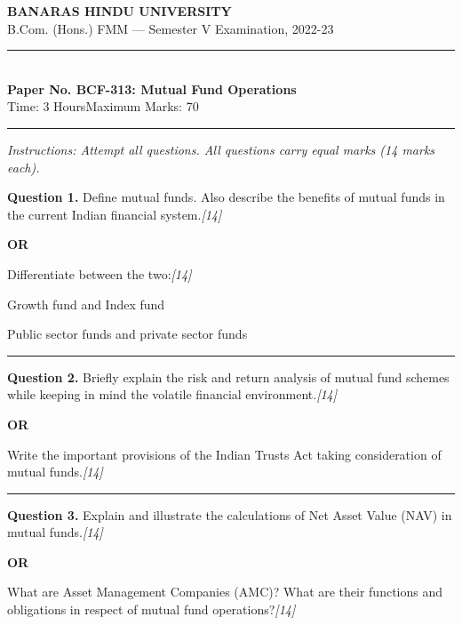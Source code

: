 \documentclass[11pt,a4paper]{article}
\newcommand{\pts}[1]{\hfill   \textit{[#1]}}
\begin{document}
\begin{center}
  {\large\bfseries BANARAS HINDU UNIVERSITY}\\[2pt]
  {\normalsize B.Com. (Hons.) FMM --- Semester V Examination, 2022-23}\\[6pt]
  \rule{0.8\linewidth}{0.5pt}\\[6pt]
  {\large\bfseries Paper No. BCF-313: Mutual Fund Operations}\\[4pt]
  {\normalsize Time: 3 Hours\hfill Maximum Marks: 70}
\end{center}

\rule{\linewidth}{0.4pt}

\smallskip



\noindent   \textit{Instructions: Attempt all questions. All questions carry equal marks (14 marks each).}

\bigskip




\noindent   \textbf{Question 1.}
Define mutual funds. Also describe the benefits of mutual funds in the current Indian financial system.\pts{14}

\centerline{   \textbf{OR}}

Differentiate between the two:\pts{14}

\begin{parts}
  \item Growth fund and Index fund
  \item Public sector funds and private sector funds
\end{parts}

\medskip\rule{\linewidth}{0.2pt}




\noindent   \textbf{Question 2.}
Briefly explain the risk and return analysis of mutual fund schemes while keeping in mind the volatile financial environment.\pts{14}

\centerline{   \textbf{OR}}

Write the important provisions of the Indian Trusts Act taking consideration of mutual funds.\pts{14}

\medskip\rule{\linewidth}{0.2pt}




\noindent   \textbf{Question 3.}
Explain and illustrate the calculations of Net Asset Value (NAV) in mutual funds.\pts{14}

\centerline{   \textbf{OR}}

What are Asset Management Companies (AMC)? What are their functions and obligations in respect of mutual fund operations?\pts{14}
\end{document}
